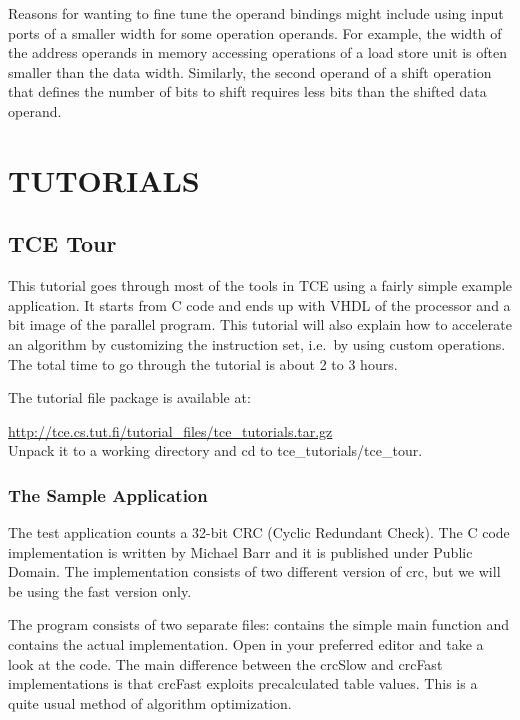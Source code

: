 \documentclass[twoside]{tceusermanual}
\begin{document}
Reasons for wanting to fine tune the operand bindings might include using
input ports of a smaller width for some operation operands. For example, the 
width of the address operands in memory accessing operations of a load store 
unit is often smaller than the data width. Similarly, the second operand of
a shift operation that defines the number of bits to shift requires less
bits than the shifted data operand.



\chapter{TUTORIALS}
\label{chapter:tutorials}


\section{TCE Tour}
\label{sec:tcetour}

This tutorial goes through most of the tools in TCE using a fairly simple
example application. It starts from C code and ends up with VHDL of the
processor and a bit image of the parallel program. This tutorial will also
explain how to accelerate an algorithm by customizing the instruction
set, i.e.\ by using custom operations. The total time  to go through
the tutorial is about 2 to 3 hours.

The tutorial file package is available at:

\url{http://tce.cs.tut.fi/tutorial_files/tce_tutorials.tar.gz}\\

Unpack it to a working directory and cd to tce\_tutorials/tce\_tour.

\subsection{The Sample Application}

The test application counts a 32-bit CRC (Cyclic Redundant Check). The C code
implementation is written by Michael Barr and it is published under Public
Domain. The implementation consists of two different version of crc, but we will
be using the fast version only.

The program consists of two separate files:  contains the simple main
function and  contains the actual implementation. Open  in
your preferred editor and take a look at the code. The
main difference between the crcSlow and crcFast implementations is that 
crcFast exploits precalculated table values. This is a quite usual method of
algorithm optimization.
\end{document}
